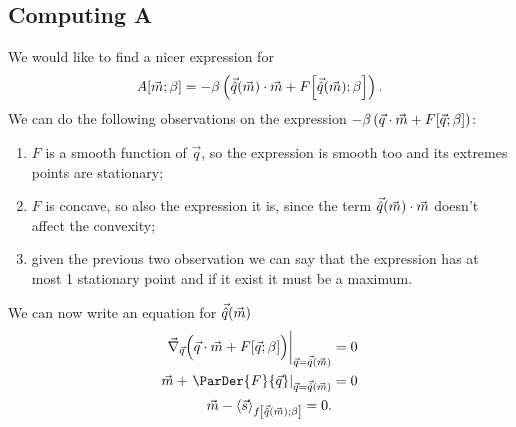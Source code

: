 
\subsection{Computing A}
We would like to find a nicer expression for
\begin{equation} \label{eq:expression-for-A}
   A{\left[\vec{m};\beta\right]} =
    -\beta \left(\vec{\hat{q}}{(\vec{m})}\cdot\vec{m} + F{\left[\vec{\hat{q}}{(\vec{m})};\beta\right]}\right).
\end{equation}
We can do the following observations on the expression 
\(-\beta \left(\vec{q}\cdot\vec{m} + F{\left[\vec{q};\beta\right]}\right)\):
\begin{enumerate}[i]
  \item \(F\) is a smooth function of \(\vec{q}\), so the expression is smooth too and its
    extremes points are stationary;
  \item \(F\) is concave, so also the expression it is, since the term \(\vec{\hat{q}}{(\vec{m})}\cdot\vec{m}\)
    doesn't affect the convexity;
  \item given the previous two observation we can say that the expression has at most 1 stationary
    point and if it exist it must be a maximum.
\end{enumerate}
We can now write an equation for \(\vec{\hat{q}}{(\vec{m})}\)
\begin{align*}
  \vec{\nabla}_{\vec{q}} \Big(\vec{q}\cdot\vec{m} + \FEn{\vec{q}}{\beta}\Big)
    \bigg|_{\vec{q}=\qhat{\vec{m}}}&=0 \\
  \vec{m} + \left.\ParDer{F}{\vec{q}}\right|_{\vec{q}=\qhat{\vec{m}}}&=0 \\
  \vec{m} - \Fmean{\vec{s}}{\qhat{\vec{m}}}{\beta} = 0.
\end{align*}
